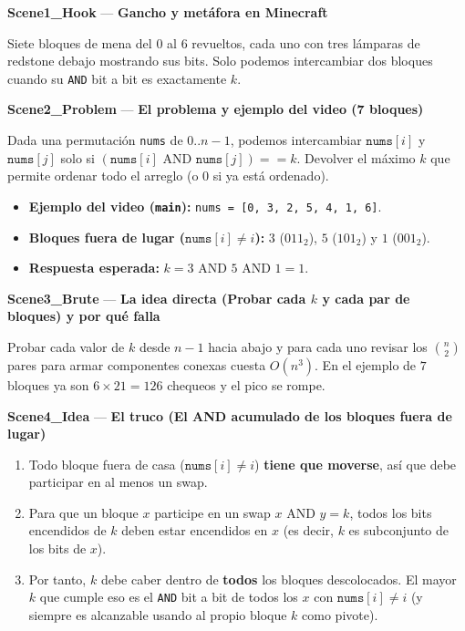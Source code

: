 \documentclass[letterpaper,10pt]{article}
\newcommand{\scene}[2]{\noindent\textbf{\textcolor{mcaqua}{#1}} --- \textbf{#2}\par\vspace{1pt}}
\begin{document}
\begin{shaded}
\scene{Scene1\_Hook}{Gancho y met\'afora en Minecraft}
Siete bloques de mena del $0$ al $6$ revueltos, cada uno con tres l\'amparas de redstone debajo mostrando sus bits. Solo podemos intercambiar dos bloques cuando su \texttt{AND} bit a bit es exactamente $k$.

\scene{Scene2\_Problem}{El problema y ejemplo del video (7 bloques)}
Dada una permutaci\'on \texttt{nums} de $0..n-1$, podemos intercambiar $\texttt{nums}[i]$ y $\texttt{nums}[j]$ solo si $(\texttt{nums}[i] \text{ AND } \texttt{nums}[j]) == k$. Devolver el m\'aximo $k$ que permite ordenar todo el arreglo (o $0$ si ya est\'a ordenado).
\begin{itemize}\setlength{\itemsep}{1pt}
  \item \textbf{Ejemplo del video (\texttt{main}):} \texttt{nums = [0, 3, 2, 5, 4, 1, 6]}.
  \item \textbf{Bloques fuera de lugar ($\texttt{nums}[i] \neq i$):} $3$ ($011_2$), $5$ ($101_2$) y $1$ ($001_2$).
  \item \textbf{Respuesta esperada:} $k = 3 \text{ AND } 5 \text{ AND } 1 = 1$.
\end{itemize}

\scene{Scene3\_Brute}{La idea directa (Probar cada $k$ y cada par de bloques) y por qu\'e falla}
Probar cada valor de $k$ desde $n-1$ hacia abajo y para cada uno revisar los $\binom{n}{2}$ pares para armar componentes conexas cuesta $O(n^3)$. En el ejemplo de $7$ bloques ya son $6 \times 21 = 126$ chequeos y el pico se rompe.

\scene{Scene4\_Idea}{El truco (El AND acumulado de los bloques fuera de lugar)}
\begin{enumerate}\setlength{\itemsep}{1pt}
  \item Todo bloque fuera de casa ($\texttt{nums}[i] \neq i$) \textbf{tiene que moverse}, as\'i que debe participar en al menos un swap.
  \item Para que un bloque $x$ participe en un swap $x \text{ AND } y = k$, todos los bits encendidos de $k$ deben estar encendidos en $x$ (es decir, $k$ es subconjunto de los bits de $x$).
  \item Por tanto, $k$ debe caber dentro de \textbf{todos} los bloques descolocados. El mayor $k$ que cumple eso es el \texttt{AND} bit a bit de todos los $x$ con $\texttt{nums}[i] \neq i$ (y siempre es alcanzable usando al propio bloque $k$ como pivote).
\end{enumerate}


\end{shaded}
\end{document}
